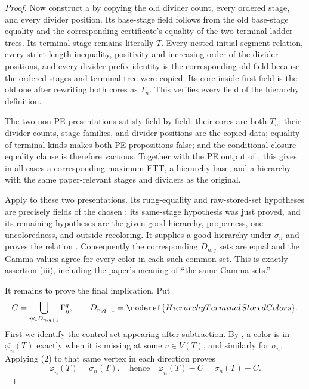 \begin{proof}
Now construct a  by copying the old divider
count, every ordered stage, and every divider position.  Its base-stage
field follows from the old base-stage equality and the corresponding
certificate's equality of the two terminal ladder trees.  Its terminal
stage remains literally $T$.  Every nested initial-segment relation,
every strict length inequality, positivity and increasing order of the
divider positions, and every divider-prefix identity is the corresponding
old field because the ordered stages and terminal tree were copied.  Its
core-inside-first field is the old one after rewriting both cores as
$T_n$.  This verifies every field of the hierarchy definition.

The two non-PE presentations satisfy
 field by field: their cores are both
$T_n$; their divider counts, stage families, and divider positions are
the copied data; equality of terminal kinds makes both PE propositions
false; and the conditional closure-equality clause is therefore vacuous.
Together with the PE output of , this gives in
all cases a corresponding maximum ETT, a hierarchy base, and a hierarchy
with the same paper-relevant stages and dividers as the original.

Apply  to these two presentations.
Its rung-equality and raw-stored-set hypotheses are precisely fields of
the chosen ; its same-stage
hypothesis was just proved, and its remaining hypotheses are the given
good hierarchy, properness, one-uncoloredness, and outside recoloring.
It supplies a good hierarchy under $\sigma_n$ and proves the relation
.  Consequently the corresponding
$D_{n,j}$ sets are equal and the Gamma values agree for every color in
each such common set.  This is exactly assertion (iii), including the
paper's meaning of ``the same Gamma sets.''

It remains to prove the final implication.  Put
\[
 C=\bigcup_{\eta\in D_{n,q+1}}\Gamma^q_\eta,
 \qquad
 D_{n,q+1}=\noderef{HierarchyTerminalStoredColors}.
\]
First we identify the control set appearing after subtraction.  By
, a color is in
$\overline{\varphi_n}(T)$ exactly when it is missing at some
$v\in V(T)$, and similarly for $\sigma_n$.  Applying (2) to that same
vertex in each direction proves
\[
       \overline{\varphi_n}(T)=\overline{\sigma_n}(T),
 \quad\text{hence}\quad
       \overline{\varphi_n}(T)-C
        =\overline{\sigma_n}(T)-C.                            \tag{7}
\]


\end{proof}
